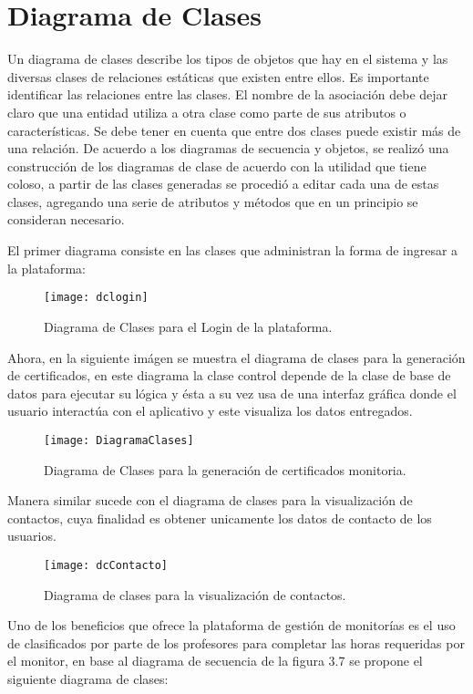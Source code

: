\newpage

\section{Diagrama de Clases}

Un diagrama de clases describe los tipos de objetos que hay en el sistema y las diversas clases de relaciones estáticas que existen entre ellos.
Es importante identificar las relaciones entre las clases. El nombre de la asociación debe dejar claro que una entidad utiliza a otra clase como parte de sus atributos o características. Se debe tener en cuenta que entre dos clases puede existir más de una relación.\cite{Sergio_2015}
\newline
De acuerdo a los diagramas de secuencia y objetos, se realizó una construcción de los diagramas de clase de acuerdo con la utilidad que tiene coloso, a partir de las clases generadas se procedió a editar cada una de estas clases, agregando una serie de atributos y métodos que en un principio se consideran necesario.

El primer diagrama consiste en las clases que administran la forma de ingresar a la plataforma:

\begin{figure}[H]
	\centering
	\texttt{[image: dclogin]}
    \centering
    \caption{Diagrama de Clases para el Login de la plataforma.}
	\label{fig:dClaLogin}
\end{figure}

\newpage
Ahora, en la siguiente imágen se muestra el diagrama de clases para la generación de certificados, en este diagrama la clase control depende de la clase de base de datos para ejecutar su lógica y ésta a su vez usa de una interfaz gráfica donde el usuario interactúa con el aplicativo y este visualiza los datos entregados.

\begin{figure}[H]
	\centering
	\texttt{[image: DiagramaClases]}
    \centering
    \caption{Diagrama de Clases para la generación de certificados monitoria.}
	\label{fig:dClaCertificado}
\end{figure}

\newpage
Manera similar sucede con el diagrama de clases para la visualización de contactos, cuya finalidad es obtener unicamente los datos de contacto de los usuarios.
\begin{figure}[H]
	\centering
	\texttt{[image: dcContacto]}
    \centering
    \caption{Diagrama de clases para la visualización de contactos.}
	\label{fig:dClaContacto}
\end{figure}
\newpage
\clearpage
Uno de los beneficios que ofrece la plataforma de gestión de monitorías es el uso de clasificados por parte de los profesores para completar las horas requeridas por el monitor, en base al diagrama de secuencia de la figura 3.7 se propone el siguiente diagrama de clases:

